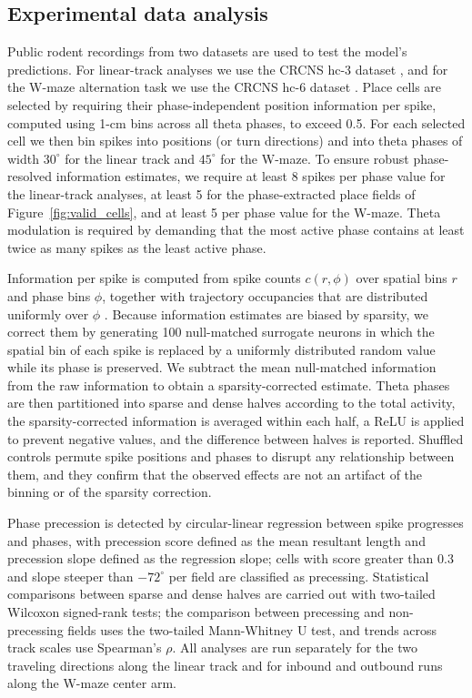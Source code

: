\documentclass[11pt]{article}
\begin{document}
\subsection{Experimental data analysis}

Public rodent recordings from two datasets are used to test the model's
predictions. For linear-track analyses we use the CRCNS hc-3 dataset
\cite{mizuseki2013hc3}, and for the W-maze alternation task we use the CRCNS
hc-6 dataset \cite{karlsson2015hc6}. Place cells are selected by requiring
their phase-independent position information per spike, computed using 1-cm
bins across all theta phases, to exceed 0.5. For each selected cell we then
bin spikes into positions (or turn directions) and into theta phases of
width $30^\circ$ for the linear track and $45^\circ$ for the W-maze. To
ensure robust phase-resolved information estimates, we require at least 8
spikes per phase value for the linear-track analyses, at least 5 for the
phase-extracted place fields of Figure~\ref{fig:valid_cells}, and at least 5
per phase value for the W-maze. Theta modulation is required by demanding
that the most active phase contains at least twice as many spikes as the
least active phase.

Information per spike is computed from spike counts $c(r,\phi)$ over spatial
bins $r$ and phase bins $\phi$, together with trajectory occupancies that are
distributed uniformly over $\phi$ \cite{skaggs1996theta}. Because
information estimates are biased by sparsity, we correct them by generating
100 null-matched surrogate neurons in which the spatial bin of each spike is
replaced by a uniformly distributed random value while its phase is
preserved. We subtract the mean null-matched information from the raw
information to obtain a sparsity-corrected estimate. Theta phases are then
partitioned into sparse and dense halves according to the total activity,
the sparsity-corrected information is averaged within each half, a ReLU is
applied to prevent negative values, and the difference between halves is
reported. Shuffled controls permute spike positions and phases to disrupt
any relationship between them, and they confirm that the observed effects
are not an artifact of the binning or of the sparsity correction.

Phase precession is detected by circular-linear regression between spike
progresses and phases, with precession score defined as the mean resultant
length and precession slope defined as the regression slope; cells with
score greater than $0.3$ and slope steeper than $-72^\circ$ per field are
classified as precessing. Statistical comparisons between sparse and dense
halves are carried out with two-tailed Wilcoxon signed-rank tests; the
comparison between precessing and non-precessing fields uses the two-tailed
Mann-Whitney U test, and trends across track scales use Spearman's $\rho$.
All analyses are run separately for the two traveling directions along the
linear track and for inbound and outbound runs along the W-maze center arm.
\end{document}
